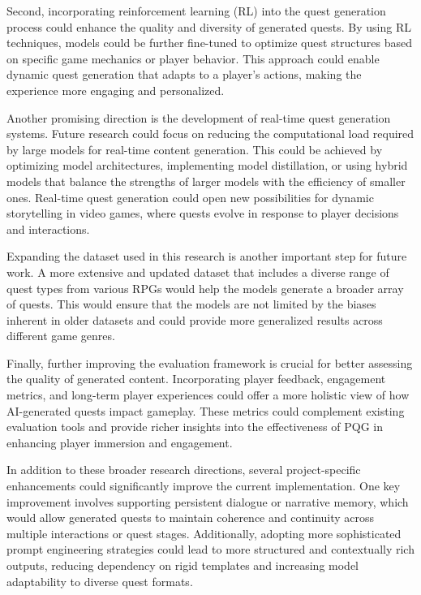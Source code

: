 Second, incorporating reinforcement learning (RL) into the quest generation process
could enhance the quality and diversity of generated quests. By using RL techniques,
models could be further fine-tuned to optimize quest structures based on specific game
mechanics or player behavior. This approach could enable dynamic quest generation that
adapts to a player's actions, making the experience more engaging and personalized.

Another promising direction is the development of real-time quest generation systems.
Future research could focus on reducing the computational load required by large models
for real-time content generation. This could be achieved by optimizing model architectures,
implementing model distillation, or using hybrid models that balance the strengths
of larger models with the efficiency of smaller ones. Real-time quest generation could open
new possibilities for dynamic storytelling in video games, where quests evolve in response
to player decisions and interactions.

Expanding the dataset used in this research is another important step for future work.
A more extensive and updated dataset that includes a diverse range of quest types from
various RPGs would help the models generate a broader array of quests. This would
ensure that the models are not limited by the biases inherent in older datasets and could
provide more generalized results across different game genres.

Finally, further improving the evaluation framework is crucial for better assessing the
quality of generated content. Incorporating player feedback, engagement metrics, and
long-term player experiences could offer a more holistic view of how AI-generated quests
impact gameplay. These metrics could complement existing evaluation tools and provide
richer insights into the effectiveness of PQG in enhancing player immersion
and engagement.

In addition to these broader research directions, several project-specific enhancements
could significantly improve the current implementation. One key improvement involves
supporting persistent dialogue or narrative memory, which would allow generated quests
to maintain coherence and continuity across multiple interactions or quest stages. Additionally,
adopting more sophisticated prompt engineering strategies could lead to more
structured and contextually rich outputs, reducing dependency on rigid templates and increasing
model adaptability to diverse quest formats.

